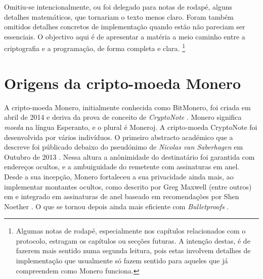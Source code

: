 Omitiu-se intencionalmente, ou foi delegado para notas de rodapé, alguns detalhes matemáticos, que tornariam o texto menos claro. Foram também omitidos detalhes concretos de implementação quando estão não pareciam ser essenciais. O objectivo aqui é de apresentar a matéria a meio caminho entre a criptografia e a programação, de forma completa e clara.  
\footnote{Algumas notas de rodapé, especialmente nos capítulos relacionados com o protocolo, estragam os capítulos ou secções futuras. A intenção destas, é de fazerem mais sentido numa segunda leitura, pois estas involvem detalhes de implementação que usualmente só fazem sentido para aqueles que já compreendem como Monero funciona.}   

\section{Origens da cripto-moeda Monero}

A cripto-moeda Monero, initialmente conhecida como BitMonero, foi criada em abril de 2014 e deriva da prova de conceito de {\em CryptoNote} \cite{bitmonero-launched}.
Monero significa {\em moeda} na língua Esperanto, e o plural é Moneroj.
A cripto-moeda CryptoNote foi desenvolvida por vários indivíduos. O primeiro abstracto académico que a descreve foi públicado debaixo do pseudónimo de {\em Nicolas van Saberhagen} em Outubro de 2013 \cite{cryptoNoteWhitePaper}. Nessa altura a anônimidade do destinatário foi garantida com endereços ocultos, e a ambuiguidade do remetente com assinaturas em anel. 
Desde a sua incepção, Monero fortaleceu a sua privacidade ainda mais, ao implementar montantes ocultos, como descrito por Greg Maxwell (entre outros) em \cite{Signatures2015BorromeanRS} e integrado em assinaturas de anel baseado em recomendações por Shen Noether \cite{MRL-0005-ringct}. O que se tornou depois ainda mais eficiente com {\em Bulletproofs} \cite{Bulletproofs_paper}.

